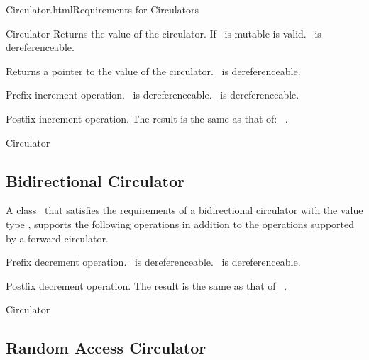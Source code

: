 \begin{ccHtmlClassFile}{Circulator.html}{Requirements for Circulators}
\begin{ccClass}{Circulator}
{Returns the value of the circulator.
 If \ccClassName\ is mutable  is valid.
 \ccPrecond \ccVar\ is dereferenceable.}

{Returns a pointer to the value of the circulator.
 \ccPrecond \ccVar\ is dereferenceable.}

{Prefix increment operation.
\ccPrecond \ccVar\ is dereferenceable. 
\ccPostcond \ccVar\ is dereferenceable.}

{Postfix increment operation. The result is the same as that of: 
 ~.}

\end{ccClass} 


\ccHtmlNoClassLinks
\ccHtmlNoClassIndex
\begin{ccClass}{Circulator}
\subsection{Bidirectional Circulator}

A class \ccClassName\ that satisfies the requirements of a bidirectional
circulator with the value type , supports the following operations
in addition to the operations supported by a forward circulator.

\ccTypes
{}


\ccPropagateThreeToTwoColumns
{}
\ccOperations

{Prefix decrement operation.
 \ccPrecond \ccVar\ is dereferenceable. \ccPostcond\ccVar\ is dereferenceable.}

{Postfix decrement operation. The result is the same as that of 
 ~.}

\end{ccClass} 


\ccHtmlNoClassLinks
\ccHtmlNoClassIndex
\begin{ccClass}{Circulator}
\subsection{Random Access Circulator}
\label{sectionRandomAccessCirculatorRequ}


\end{ccClass}
\end{ccHtmlClassFile}

